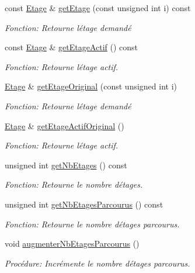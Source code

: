\begin{DoxyCompactItemize}
const \mbox{\hyperlink{classEtage}{Etage}} \& \mbox{\hyperlink{classDonjon_aa5353e928754eedad69de4c14ad19935}{get\+Etage}} (const unsigned int i) const
\begin{DoxyCompactList}\small\item\em Fonction\+: Retourne l\textquotesingle{}étage demandé \end{DoxyCompactList}\item 
const \mbox{\hyperlink{classEtage}{Etage}} \& \mbox{\hyperlink{classDonjon_ac9e5d39d9a46d7dfc4315b6b0041ab17}{get\+Etage\+Actif}} () const
\begin{DoxyCompactList}\small\item\em Fonction\+: Retourne l\textquotesingle{}étage actif. \end{DoxyCompactList}\item 
\mbox{\hyperlink{classEtage}{Etage}} \& \mbox{\hyperlink{classDonjon_a868c243fbaa68f2da220c91bb7e32e8e}{get\+Etage\+Original}} (const unsigned int i)
\begin{DoxyCompactList}\small\item\em Fonction\+: Retourne l\textquotesingle{}étage demandé \end{DoxyCompactList}\item 
\mbox{\hyperlink{classEtage}{Etage}} \& \mbox{\hyperlink{classDonjon_adaf17f262a479ab2ce8e35ef48f8c157}{get\+Etage\+Actif\+Original}} ()
\begin{DoxyCompactList}\small\item\em Fonction\+: Retourne l\textquotesingle{}étage actif. \end{DoxyCompactList}\item 
unsigned int \mbox{\hyperlink{classDonjon_a24a730ec71daad25b5ce79bccc10797d}{get\+Nb\+Etages}} () const
\begin{DoxyCompactList}\small\item\em Fonction\+: Retourne le nombre d\textquotesingle{}étages. \end{DoxyCompactList}\item 
unsigned int \mbox{\hyperlink{classDonjon_a14ee54cc631289310c622540c2cda199}{get\+Nb\+Etages\+Parcourus}} () const
\begin{DoxyCompactList}\small\item\em Fonction\+: Retourne le nombre d\textquotesingle{}étages parcourus. \end{DoxyCompactList}\item 
void \mbox{\hyperlink{classDonjon_abe40dcef2369d3e84b2298b0ad019988}{augmenter\+Nb\+Etages\+Parcourus}} ()
\begin{DoxyCompactList}\small\item\em Procédure\+: Incrémente le nombre d\textquotesingle{}étages parcourus. \end{DoxyCompactList}\end{DoxyCompactItemize}



